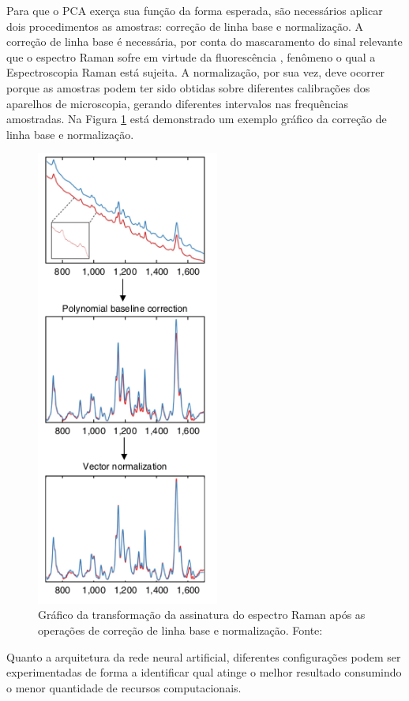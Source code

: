 \documentclass[conference,peerreview]{IEEEtran}
\begin{document}
Para que o PCA exerça sua função da forma esperada, são necessários aplicar dois procedimentos as amostras: correção de linha base e normalização. A correção de linha base é necessária, por conta do mascaramento do sinal relevante que o espectro Raman sofre em virtude da fluorescência \cite{DeGoes2016}, fenômeno o qual a Espectroscopia Raman está sujeita. A normalização, por sua vez, deve ocorrer porque as amostras podem ter sido obtidas sobre diferentes calibrações dos aparelhos de microscopia, gerando diferentes intervalos nas frequências amostradas. Na Figura \ref{baseline_correction_normalization} está demonstrado um exemplo gráfico da correção de linha base e normalização.

\begin{figure}[ht]
\centering
\includegraphics[width=6cm]{baseline_correction_normalization}
\caption{Gráfico da transformação da assinatura do espectro Raman após as operações de correção de linha base e normalização. Fonte: \cite{Butler2016}}
\label{baseline_correction_normalization}
\end{figure}

Quanto a arquitetura da rede neural artificial, diferentes configurações podem ser experimentadas de forma a identificar qual atinge o melhor resultado consumindo o menor quantidade de recursos computacionais.
\end{document}
